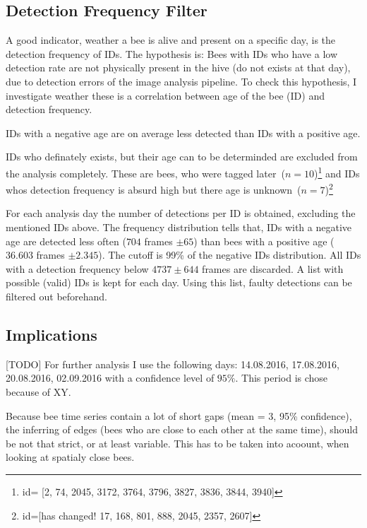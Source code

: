 \subsection{Detection Frequency Filter}
A good indicator, weather a bee is alive and present on a specific day, is the detection frequency of IDs. The hypothesis is: Bees with IDs who have a low detection rate are not physically present in the hive (do not exists at that day), due to detection errors of the image analysis pipeline.
To check this hypothesis, I investigate weather these is a correlation between age of the bee (ID) and detection frequency.



IDs with a negative age are on average less detected than IDs with a positive age.

IDs who definately exists, but their age can to be determinded are excluded from the analysis completely. These are bees, who were tagged later~($n=10$)\footnote{id= [2,
	74,
	2045,
	3172,
	3764,
	3796,
	3827,
	3836,
	3844,
	3940]} and IDs whos detection frequency is absurd high but there age is unknown~($n=7$)\footnote{id=[has changed! 
	17,
	168,
	801,
	888,
	2045,
	2357,
	2607]}

For each analysis day the number of detections per ID is obtained, excluding the mentioned IDs above. The frequency distribution tells that, IDs with a negative age are detected less often ($704$ frames $\pm 65$)  than bees with a positive age ($36.603$ frames $\pm 2.345$). The cutoff is 99\% of the negative IDs distribution. All IDs with a detection frequency below $4737 \pm 644$ frames are discarded. A list with possible (valid) IDs is kept for each day. Using this list, faulty detections can be filtered out beforehand.

\clearpage
\subsection{Implications}
[TODO]
For further analysis I use the following days: 14.08.2016, 17.08.2016, 20.08.2016, 02.09.2016 with a confidence level of $95\%$. This period is chose because of XY.

Because bee time series contain a lot of short gaps (mean = 3, 95\% confidence), the inferring of edges (bees who are close to each other at the same time), should be not that strict, or at least variable. This has to be taken into acoount, when looking at spatialy close bees.